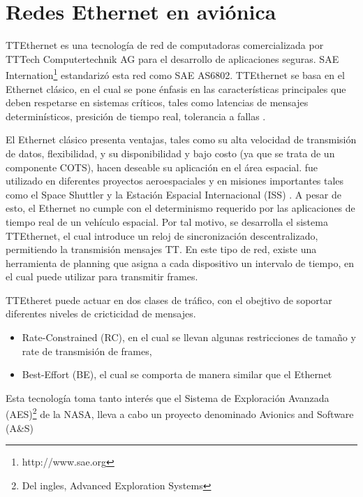 \section{Redes Ethernet en aviónica}
TTEthernet es una tecnología de red de computadoras comercializada por TTTech Computertechnik AG para el desarrollo de aplicaciones seguras. SAE Internation\footnote{http://www.sae.org} estandarizó esta red como SAE AS6802. TTEthernet se basa en el Ethernet clásico, en el cual se pone énfasis en las características principales que deben respetarse en sistemas críticos, tales como latencias de mensajes determinísticos, presición de tiempo real, tolerancia a fallas \citep{Loveless15}.

El Ethernet clásico presenta ventajas, tales como su alta velocidad de transmisión de datos, flexibilidad, y su disponibilidad y bajo costo (ya que se trata de un componente COTS)\citep{Loveless15}, hacen deseable su aplicación en el área espacial.  fue utilizado en diferentes proyectos aeroespaciales y en misiones importantes tales como el Space Shuttler y la Estación Espacial Internacional (ISS) \citep{Loveless15}. A pesar de esto, el Ethernet no cumple con el determinismo requerido por las aplicaciones de tiempo real de un vehículo espacial. Por tal motivo, se desarrolla el sistema TTEthernet, el cual introduce un reloj de sincronización descentralizado, permitiendo la transmisión mensajes \ac{TT}. En este tipo de red, existe una herramienta de planning que asigna a cada dispositivo un intervalo de tiempo, en el cual puede utilizar para transmitir frames.

TTEtheret puede actuar en dos clases de tráfico, con el obejtivo de soportar diferentes niveles de cricticidad de mensajes.
\begin{itemize}
  \item Rate-Constrained (RC), en el cual se llevan algunas restricciones de tamaño y rate de transmisión de frames,
  \item Best-Effort (BE), el cual se comporta de manera similar que el Ethernet
\end{itemize}

Esta tecnología toma tanto interés que el Sistema de Exploración Avanzada (AES)\footnote{Del ingles, Advanced Exploration Systems} de la \ac{NASA}, lleva a cabo un proyecto denominado Avionics and Software (A&S)
